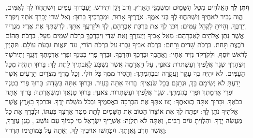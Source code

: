 
\label{veyiten-lecha}

\textbf{וְיִתֶּן לְךָ} הָאֱלֹהִים מִטַּל הַשָּׁמַיִם וּמִשְׁמַנֵּי הָאָרֶץ. וְרֹב דָּגָן ותִירֹשׁ: יַעַבְדוּךָ עַמִּים וְיִשְׁתַּחֲווּ לְךָ לְאֻמִּים, הֱוֵה גְבִיר לְאַחֶיךָ וְיִשְׁתַּחֲווּ לְךָ בְּנֵי אִמֶּךָ. אֹרֲרֶיךָ אָרוּר, וּמְבָרְכֶיךָ בָּרוּךְ: וְאֵל שַׁדַּי יְבָרֵךְ אֹתְךָ וְיַפְרְךָ וְיַרְבֶּךָ. וְהָיִיתָ לִקְהַל עַמִּים: וְיִתֶּן לְךָ אֶת בִּרְכַּת אַבְרָהָם, לְךָ וּלְזַרְעֲךָ אִתָּךְ. לְרִשְׁתְּךָ אֶת אֶרֶץ מְגֻרֶיךָ אֲשֶׁר נָתַן אֱלֹהִים לְאַבְרָהָם: מֵאֵל אָבִיךָ וְיַעְזרֶךָּ וְאֵת שַׁדַּי וִיבָרְכֶךָּ בִּרְכֹת שָׁמַיִם מֵעָל, בִּרְכֹת תְּהוֹם רֹבֶצֶת תָּחַת. בִּרְכֹת שָׁדַיִם וָרָחַם: בִּרְכֹת אָבִיךָ גָּבְרוּ עַל בִּרְכֹת הוֹרַי, עַד תַּאֲוַת גִּבְעֹת עוֹלָם. תִּהְיֶיןָ לְרֹאשׁ יוֹסֵף, וּלְקֹדְקֹד נְזִיר אֶחָיו: וַאֲהֵבְךָ וּבֵרַכְךָ והִרְבֶּךָ. וּבֵרַךְ פְּרִי בִטְנְךָ וּפְרִי אַדְמָתֶךָ דְּגָנְךָ וְתִירֹשְׁךָ וְיִצְהָרֶךָ שְׁגַר אֲלָפֶיךָ וְעַשְׁתּרֹת צֹאנֶךָ, עַל הָאֲדָמָה אֲשֶׁר נִשְׁבַּע לַאֲבֹתֶיךָ לָתֶת לָךְ: בָּרוּךְ תִּהְיֶה מִכָּל הָעַמִּים. לֹא יִהְיֶה בְךָ עָקָר וַעֲקָרָה וּבִבְהֶמְתֶּךָ: וְהֵסִיר \Shem{} מִמְּךָ כָּל חֹלִי. וְכָל מַדְוֵי מִצְרַיִם הָרָעִים אֲשֶׁר יָדַעְתָּ לֹא יְשִׂימָם בָּךְ, וּנְתָנָם בְּכָל שֹׂנְאֶיךָ: בָּרוּךְ אַתָּה בָּעִיר. וּבָרוּךְ אַתָּה בַּשָּׂדֶה: בָּרוּךְ פְּרִי בִטְנְךָ וּפְרִי אַדְמָתְךָ וּפְרִי בְהֶמְתֶּךָ. שְׁגַר אֲלָפֶיךָ ועַשְׁתְּרוֹת צֹאנֶךָ: בָּרוּךְ טַנְאֲךָ וּמִשְׁאַרְתֶּךָ: בָּרוּךְ אַתָּה בּבֹאֶךָ. וּבָרוּךְ אַתָּה בְּצֵאתֶךָ: יְצַו \Shem{} אִתְּךָ אֶת הַבְּרָכָה בַּאֲסָמֶיךָ וּבְכֹל מִשְׁלַח יָדֶךָ. וּבֵרַכְךָ בָּאָרֶץ אֲשֶׁר \Shem{} אֱלֹהֶיךָ נֹתֵן לָךְ: יִפְתַּח \Shem{} לְךָ אֶת אוֹצָרוֹ הַטּוֹב אֶת הַשָּׁמַיִם לָתֵת מְטַר אַרְצְךָ בְּעִתּוֹ, וּלְבָרֵךְ אֵת כָּל מַעֲשֵׂה יָדֶךָ. והִלְוִיתָ גּוֹיִם רַבִּים, וְאַתָּה לֹא תִלְוֶה: אַשְׁרֶיךָ יִשְׂרָאֵל מִי כָמוֹךָ עַם נוֹשַׁע , מָגֵן עֶזְרֶךָ, וַאֲשֶׁר חֶרֶב גַּאֲוָתֶךָ. ויִכָּחֲשׁוּ אוֹיבֶיךָ לָךְ, וְאַתָּה עַל בָּמוֹתֵימוֹ תִדְרֹךְ:

